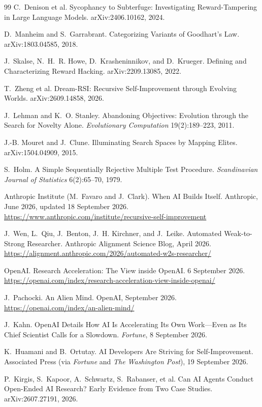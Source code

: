 \documentclass[11pt,a4paper]{article}
\begin{document}
\begin{thebibliography}{99}
 C.~Denison et al. Sycophancy to Subterfuge: Investigating Reward-Tampering in Large Language Models. arXiv:2406.10162, 2024.

 D.~Manheim and S.~Garrabrant. Categorizing Variants of Goodhart's Law. arXiv:1803.04585, 2018.

 J.~Skalse, N.~H.~R. Howe, D.~Krasheninnikov, and D.~Krueger. Defining and Characterizing Reward Hacking. arXiv:2209.13085, 2022.

 T.~Zheng et al. Dream-RSI: Recursive Self-Improvement through Evolving Worlds. arXiv:2609.14858, 2026.

 J.~Lehman and K.~O. Stanley. Abandoning Objectives: Evolution through the Search for Novelty Alone. \emph{Evolutionary Computation} 19(2):189--223, 2011.

 J.-B. Mouret and J.~Clune. Illuminating Search Spaces by Mapping Elites. arXiv:1504.04909, 2015.

 S.~Holm. A Simple Sequentially Rejective Multiple Test Procedure. \emph{Scandinavian Journal of Statistics} 6(2):65--70, 1979.

 Anthropic Institute (M.~Favaro and J.~Clark). When AI Builds Itself. Anthropic, June 2026, updated 18 September 2026. \url{https://www.anthropic.com/institute/recursive-self-improvement}

 J.~Wen, L.~Qiu, J.~Benton, J.~H. Kirchner, and J.~Leike. Automated Weak-to-Strong Researcher. Anthropic Alignment Science Blog, April 2026. \url{https://alignment.anthropic.com/2026/automated-w2s-researcher/}

 OpenAI. Research Acceleration: The View inside OpenAI. 6 September 2026. \url{https://openai.com/index/research-acceleration-view-inside-openai/}

 J.~Pachocki. An Alien Mind. OpenAI, September 2026. \url{https://openai.com/index/an-alien-mind/}

 J.~Kahn. OpenAI Details How AI Is Accelerating Its Own Work---Even as Its Chief Scientist Calls for a Slowdown. \emph{Fortune}, 8 September 2026.

 K.~Huamani and B.~Ortutay. AI Developers Are Striving for Self-Improvement. Associated Press (via \emph{Fortune} and \emph{The Washington Post}), 19 September 2026.

 P.~Kirgis, S.~Kapoor, A.~Schwartz, S.~Rabanser, et al. Can AI Agents Conduct Open-Ended AI Research? Early Evidence from Two Case Studies. arXiv:2607.27191, 2026.


\end{thebibliography}
\end{document}
